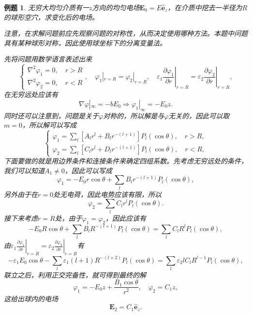 \documentclass[UTF8]{ctexbook}
\renewcommand{\b}{\boldsymbol}
\newtheorem{eg}{例题}
\numberwithin{equation}{chapter}
\begin{document}
	\begin{eg}
		无穷大均匀介质有一$z$方向的均匀电场$\b{E}_0=E\hat{\b{e}}_z$，在介质中挖去一半径为$R$的球形空穴，求变化后的电场。
		\begin{figure}[H]
			\centering
		\end{figure}
		注意，在求解问题前应先观察问题的对称性，从而决定使用哪种方法。本题中问题具有某种球形对称，因此使用球坐标下的分离变量法。
		
		先将问题用数学语言表述出来
		\[\left\{\begin{gathered}
			\nabla^2 \varphi_1=0, \quad r>R\\ 
			\nabla^2 \varphi_2 =0,\quad r<R\end{gathered}\right.,\quad \varphi_1|_{r=R}=\varphi_2|_{r=R},\quad \varepsilon_1\left.\frac{\partial \varphi_1}{\partial r}\right|_{r=R}=\varepsilon_2\left.\frac{\partial \varphi_2}{\partial r}\right|_{r=R},\]
		在无穷远处应该有
		\[\nabla\varphi|_\infty=-b{E}_0\Rightarrow \varphi_1|_\infty=-E_0z.\]
		同时还可以注意到，问题是关于$\varphi$对称的，所以解是与$\varphi$无关的，因此可以取$m=0$，所以解可以写成
		\[\left\{\begin{gathered}
			\varphi_1=\sum_{l} \left[A_l r^l+B_lr^{-(l+1)}\right]P_l(\cos\theta),\quad r>R, \\
			\varphi_2=\sum_{l} \left[C_l r^l+D_lr^{-(l+1)}\right]P_l(\cos\theta),\quad r<R,
		\end{gathered}\right.\]
		下面要做的就是用边界条件和连接条件来确定四组系数。先考虑无穷远处的条件，我们可以知道$A_1\neq0$，因此可以写成
		\[\varphi_1=-E_0r\cos\theta+\sum_{l}B_lr^{-(l+1)}P_l(\cos\theta),\]
		另外由于在$r=0$处无电荷，因此电势应该有限，所以
		\[\varphi_2=\sum_l C_l r^lP_l(\cos\theta).\]
		接下来考虑$r=R$处，由于$\varphi_1=\varphi_2$，因此应该有
		\[-E_0 R\cos\theta+\sum_{l} B_lR^{-(l+1)}P_l(\cos\theta)=\sum_lC_lR^lP_l(\cos\theta),\]
		由$\varepsilon_1\left.\frac{\partial \varphi_1}{\partial r}\right|_{r=R}=\varepsilon_2\left.\frac{\partial \varphi_2}{\partial r}\right|_{r=R}$有
		\[-\varepsilon_1E_0\cos\theta-\sum_l \varepsilon_1 (l+1)R^{-(l+2)}P_l(\cos\theta)=\sum_l\varepsilon_2lC_lR^{l-1}P_l(\cos\theta),\]
		联立之后，利用正交完备性，就可得到最终的解
		\[\varphi_1=-E_0z+\frac{B_1\cos\theta}{r^2},\quad \varphi_2=C_1z,\]
		这给出球内的电场
		\[\b{E}_2=C_1\hat{\b{e}}_z.\]
	\end{eg}
	
\end{document}
